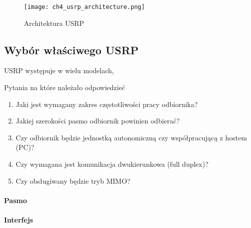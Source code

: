 \begin{figure}
\centering
\texttt{[image: ch4\_usrp\_architecture.png]}
\caption{Architektura USRP}
\label{usrp_architecture}
\end{figure}

\subsection{Wybór właściwego USRP}
USRP występuje w wielu modelach, 

Pytania na które należało odpowiedzieć
\begin{enumerate}
\item Jaki jest wymagany zakres częstotliwości pracy odbiornika?
\item Jakiej szerokości pasmo odbiornik powinien odbierać?
\item Czy odbiornik będzie jednostką autonomiczną czy współpracującą z hostem (PC)?
\item Czy wymagana jest komunikacja dwukierunkowa (full duplex)?
\item Czy obsługiwany będzie tryb MIMO?
\end{enumerate}

\paragraph{Pasmo} 
\paragraph{Interfejs}



